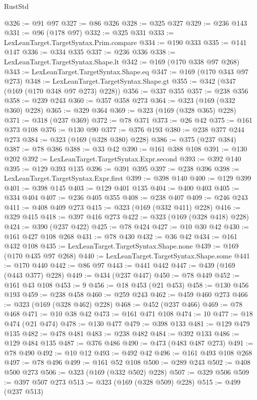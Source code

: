 \begin{lexlean}{RustStd}
\begin{coremodule}
@326 := @91 @97
@327 := @86 @326
@328 := @325 @327
@329 := @236 @143
@331 := @96 (@178 @97)
@332 := @325 @331
@333 := LexLeanTarget.TargetSyntax.Prim.compare
@334 := @190 @333
@335 := @141 @147
@336 := @334 @335
@337 := @236 @336
@338 := LexLeanTarget.TargetSyntax.Shape.lt
@342 := @169 (@170 @338 @97 @268)
@343 := LexLeanTarget.TargetSyntax.Shape.eq
@347 := @169 (@170 @343 @97 @273)
@348 := LexLeanTarget.TargetSyntax.Shape.gt
@355 := @342 (@347 (@169 (@170 @348 @97 @273) @228))
@356 := @337 @355
@357 := @238 @356
@358 := @239 @243
@360 := @357 @358 @273
@364 := @323 (@169 (@332 @360) @228)
@365 := @329 @364
@369 := @323 (@169 (@328 @365) @228)
@371 := @318 (@237 @369)
@372 := @78 @371
@373 := @26 @42
@375 := @161 @373 @108
@376 := @130 @90
@377 := @376 @193
@380 := @238 @377 @244 @273
@384 := @323 (@169 (@328 @380) @228)
@386 := @375 (@237 @384)
@387 := @78 @386
@388 := @33 @42
@390 := @161 @388 @108
@391 := @130 @202
@392 := LexLeanTarget.TargetSyntax.Expr.second
@393 := @392 @140
@395 := @129 @393 @135
@396 := @391 @395
@397 := @238 @396
@398 := LexLeanTarget.TargetSyntax.Expr.first
@399 := @398 @140
@400 := @129 @399
@401 := @398 @145
@403 := @129 @401 @135
@404 := @400 @403
@405 := @334 @404
@407 := @236 @405 @355
@408 := @238 @407
@409 := @246 @243
@411 := @408 @409 @273
@415 := @323 (@169 (@332 @411) @228)
@416 := @329 @415
@418 := @397 @416 @273
@422 := @323 (@169 (@328 @418) @228)
@424 := @390 (@237 @422)
@425 := @78 @424
@427 := @10 @30 @42
@430 := @161 @427 @108 @268
@431 := @78 @430
@432 := @36 @42
@434 := @161 @432 @108
@435 := LexLeanTarget.TargetSyntax.Shape.none
@439 := @169 (@170 @435 @97 @268)
@440 := LexLeanTarget.TargetSyntax.Shape.some
@441 := @170 @440
@442 := @86 @97
@443 := @441 @442
@447 := @439 (@169 (@443 @377) @228)
@449 := @434 (@237 @447)
@450 := @78 @449
@452 := @161 @43 @108
@453 := 9
@456 := @18 @453 (@21 @453)
@458 := @130 @456 @193
@459 := @238 @458
@460 := @259 @243
@462 := @459 @460 @273
@466 := @323 (@169 (@328 @462) @228)
@468 := @452 (@237 @466)
@469 := @78 @468
@471 := @10 @38 @42
@473 := @161 @471 @108
@474 := 10
@477 := @18 @474 (@21 @474)
@478 := @130 @477
@479 := @398 @133
@481 := @129 @479 @135
@482 := @478 @481
@483 := @238 @482
@484 := @392 @133
@486 := @129 @484 @135
@487 := @376 @486
@490 := @473 (@483 @487 @273)
@491 := @78 @490
@492 := @10 @12
@493 := @492 @42
@496 := @161 @493 @108 @268
@497 := @78 @496
@499 := @161 @52 @108
@500 := @289 @243
@502 := @408 @500 @273
@506 := @323 (@169 (@332 @502) @228)
@507 := @329 @506
@509 := @397 @507 @273
@513 := @323 (@169 (@328 @509) @228)
@515 := @499 (@237 @513)

\end{coremodule}
\end{lexlean}
